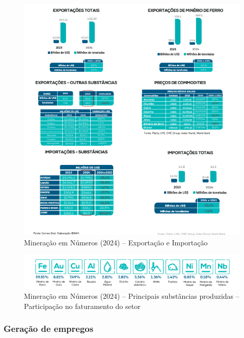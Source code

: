 \begin{figure}[htb]
    \centering
    \includegraphics[width=\textwidth]{figures/mineracao_numeros_2.png}
    \caption{Mineração em Números (2024) -- Exportação e Importação}
    \label{fig:mineracao_numeros_2}
\end{figure}

\begin{figure}[htb]
    \centering
    \includegraphics[width=\textwidth]{figures/mineracao_numeros_3.png}
    \caption{Mineração em Números (2024) -- Principais substâncias produzidas -- Participação no faturamento do setor}
    \label{fig:mineracao_numeros_3}
\end{figure}

\subsubsection{Geração de empregos}
\label{subsubsec:geracao_empregos}

